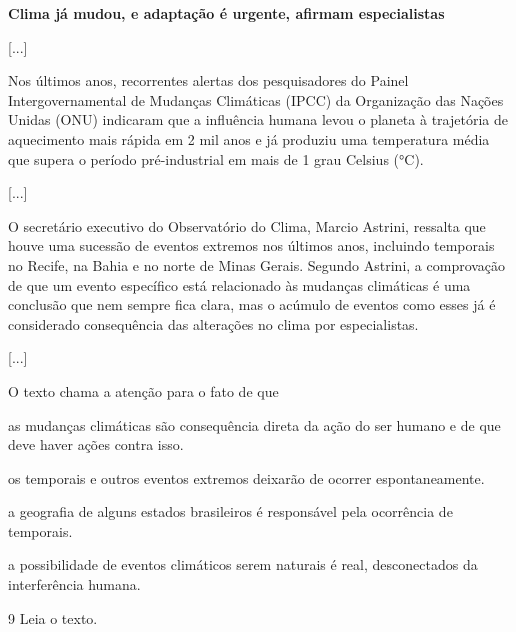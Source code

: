 \begin{myquote}
\textbf{Clima já mudou, e adaptação é urgente, afirmam especialistas}

{[}...{]}

Nos últimos anos, recorrentes alertas dos pesquisadores do Painel
Intergovernamental de Mudanças Climáticas (IPCC) da Organização das
Nações Unidas (ONU) indicaram que a influência humana levou o planeta à
trajetória de aquecimento mais rápida em 2 mil anos e já produziu uma
temperatura média que supera o período pré-industrial em mais de 1 grau
Celsius (°C).

{[}...{]}

O secretário executivo do Observatório do Clima, Marcio Astrini,
ressalta que houve uma sucessão de eventos extremos nos últimos anos,
incluindo temporais no Recife, na Bahia e no norte de Minas Gerais.
Segundo Astrini, a comprovação de que um evento específico está
relacionado às mudanças climáticas é uma conclusão que nem sempre fica
clara, mas o acúmulo de eventos como esses já é considerado consequência
das alterações no clima por especialistas.

{[}...{]}

\end{myquote}

O texto chama a atenção para o fato de que

\begin{escolha}
\item as mudanças climáticas são consequência direta da ação do ser humano e de que deve haver ações contra isso.

\item os temporais e outros eventos extremos deixarão de ocorrer espontaneamente.

\item a geografia de alguns estados brasileiros é responsável pela ocorrência de temporais.

\item a possibilidade de eventos climáticos serem naturais é real, desconectados da interferência humana.
\end{escolha}

\num{9} Leia o texto.

